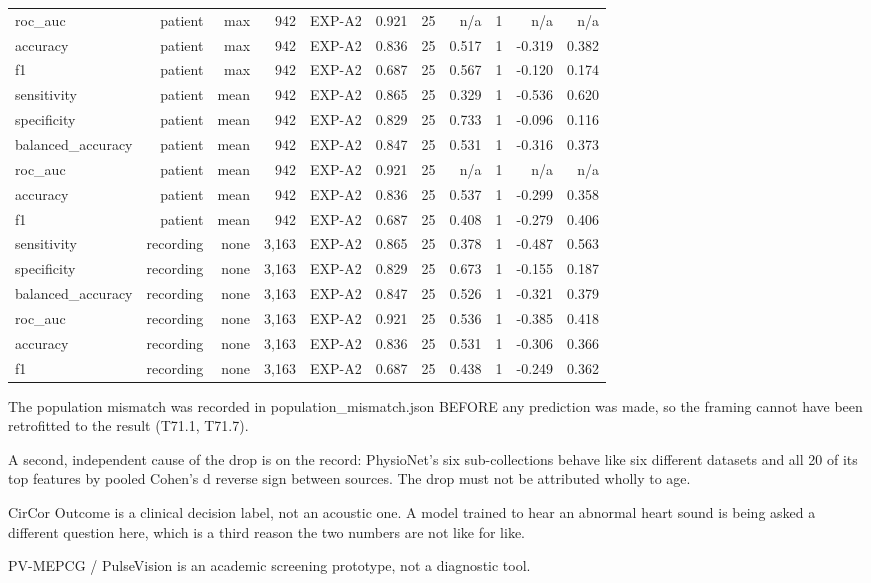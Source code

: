 \begin{table}[htbp]
\begin{tabular}{lrrrrrrrrrr}
    roc\_auc & patient & max & 942 & EXP-A2 & 0.921 & 25 & n/a & 1 & n/a & n/a \\
    accuracy & patient & max & 942 & EXP-A2 & 0.836 & 25 & 0.517 & 1 & -0.319 & 0.382 \\
    f1 & patient & max & 942 & EXP-A2 & 0.687 & 25 & 0.567 & 1 & -0.120 & 0.174 \\
    sensitivity & patient & mean & 942 & EXP-A2 & 0.865 & 25 & 0.329 & 1 & -0.536 & 0.620 \\
    specificity & patient & mean & 942 & EXP-A2 & 0.829 & 25 & 0.733 & 1 & -0.096 & 0.116 \\
    balanced\_accuracy & patient & mean & 942 & EXP-A2 & 0.847 & 25 & 0.531 & 1 & -0.316 & 0.373 \\
    roc\_auc & patient & mean & 942 & EXP-A2 & 0.921 & 25 & n/a & 1 & n/a & n/a \\
    accuracy & patient & mean & 942 & EXP-A2 & 0.836 & 25 & 0.537 & 1 & -0.299 & 0.358 \\
    f1 & patient & mean & 942 & EXP-A2 & 0.687 & 25 & 0.408 & 1 & -0.279 & 0.406 \\
    sensitivity & recording & none & 3,163 & EXP-A2 & 0.865 & 25 & 0.378 & 1 & -0.487 & 0.563 \\
    specificity & recording & none & 3,163 & EXP-A2 & 0.829 & 25 & 0.673 & 1 & -0.155 & 0.187 \\
    balanced\_accuracy & recording & none & 3,163 & EXP-A2 & 0.847 & 25 & 0.526 & 1 & -0.321 & 0.379 \\
    roc\_auc & recording & none & 3,163 & EXP-A2 & 0.921 & 25 & 0.536 & 1 & -0.385 & 0.418 \\
    accuracy & recording & none & 3,163 & EXP-A2 & 0.836 & 25 & 0.531 & 1 & -0.306 & 0.366 \\
    f1 & recording & none & 3,163 & EXP-A2 & 0.687 & 25 & 0.438 & 1 & -0.249 & 0.362 \\
    \bottomrule
  \end{tabular}
  \par\footnotesize The population mismatch was recorded in population\_mismatch.json BEFORE any prediction was made, so the framing cannot have been retrofitted to the result (T71.1, T71.7).
  \par\footnotesize A second, independent cause of the drop is on the record: PhysioNet's six sub-collections behave like six different datasets and all 20 of its top features by pooled Cohen's d reverse sign between sources. The drop must not be attributed wholly to age.
  \par\footnotesize CirCor Outcome is a clinical decision label, not an acoustic one. A model trained to hear an abnormal heart sound is being asked a different question here, which is a third reason the two numbers are not like for like.
  \par\footnotesize PV-MEPCG / PulseVision is an academic screening prototype, not a diagnostic tool.
\end{table}
